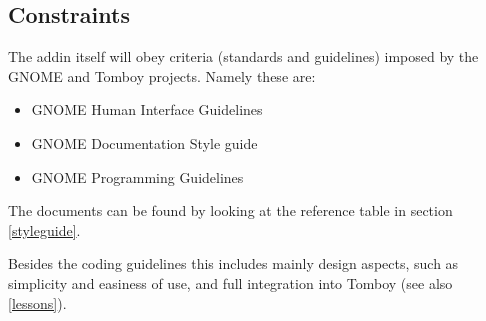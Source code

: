 \subsection{Constraints}
\label{description:constraints}
The addin itself will obey criteria (standards and guidelines) imposed by the GNOME and Tomboy projects.
Namely these are:
\begin{itemize}
 \item GNOME Human Interface Guidelines
 \item GNOME Documentation Style guide %
 \item GNOME Programming Guidelines
\end{itemize}
The documents can be found by looking at the reference table in section \ref{styleguide}.

Besides the coding guidelines this includes mainly design aspects, such as simplicity and easiness of use, and full integration into Tomboy (see also \ref{lessons}).

